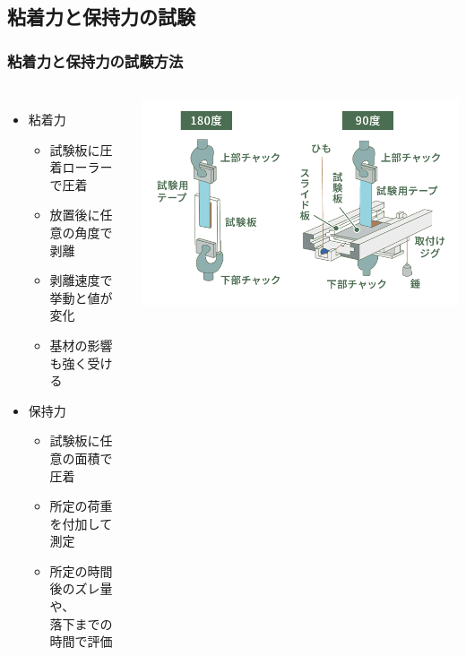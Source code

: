 \documentclass[unicode,12pt]{beamer}%
\begin{document}
\subsection{粘着力と保持力の試験}
\begin{frame}
	\frametitle{粘着力と保持力の試験方法}
		\begin{columns}[c, onlytextwidth]
			
				\begin{itemize}
					\item 粘着力
					\begin{itemize}
						\item 試験板に圧着ローラーで圧着
						\item 放置後に任意の角度で剥離
						\item 剥離速度で挙動と値が変化
						\item 基材の影響も強く受ける
					\end{itemize}
					\item 保持力
					\begin{itemize}
						\item 試験板に任意の面積で圧着
						\item 所定の荷重を付加して測定
						\item 所定の時間後のズレ量や、\\
						落下までの時間で評価
					\end{itemize}
				\end{itemize}
			
			\centering
			\includegraphics[width=\textwidth]{nenntyakuryoku.png}
			

\end{columns}
\end{frame}
\end{document}
